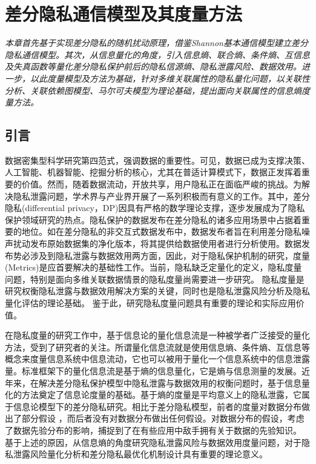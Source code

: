 
\chapter{差分隐私通信模型及其度量方法}\label{chapter03}
{\em 本章首先基于实现差分隐私的随机扰动原理，借鉴Shannon基本通信模型建立差分隐私通信模型。其次，从信息量化的角度，引入信息熵、联合熵、条件熵、互信息及失真函数等量化差分隐私保护前后的隐私信源熵、隐私泄露风险、数据效用。进一步，以此度量模型及方法为基础，针对多维关联属性的隐私量化问题，以关联性分析、关联依赖图模型、马尔可夫模型为理论基础，提出面向关联属性的信息熵度量方法。}

\section{引言}
数据密集型科学研究第四范式\cite{hey2009the}，强调数据的重要性。可见，数据已成为支撑决策、人工智能、机器智能、挖掘分析的核心，尤其在普适计算模式下，数据正发挥着重要的价值。然而，随着数据流动，开放共享，用户隐私正在面临严峻的挑战。为解决隐私泄露问题，学术界与产业界开展了一系列积极而有意义的工作。其中，差分隐私(differential privacy，DP)\cite{dwork2006differential,dwork2006calibrating}因具有严格的数学理论支撑，逐步发展成为了隐私保护领域研究的热点。隐私保护的数据发布在差分隐私的诸多应用场景中占据着重要的地位。如在差分隐私的非交互式数据发布中，数据发布者旨在利用差分隐私噪声扰动发布原始数据集的净化版本，将其提供给数据使用者进行分析使用。数据发布势必涉及到隐私泄露与数据效用两方面，因此，对于隐私保护机制的研究，度量(Metrics)是应首要解决的基础性工作。当前，隐私缺乏定量化的定义\cite{Lifenghua16}，隐私度量问题，特别是面向多维关联数据情景的隐私度量尚需要进一步研究\cite{ningbowu2019}。%
隐私度量是研究权衡隐私泄露与数据效用\cite{sankar2013utility,kalantari2018robust}解决方案的关键，同时也是隐私泄露风险分析及隐私量化评估的理论基础。 鉴于此，研究隐私度量问题具有重要的理论和实际应用价值。

在隐私度量\cite{alvim2012measuring,wagner2018technical,peng2016,xiongjinbo2018}的研究工作中，基于信息论的量化信息流\cite{smith2009on,boreale2015quantitative,alvim2011on,alvim2010differential}是一种被学者广泛接受的量化方法，受到了研究者的关注。所谓量化信息流就是使用信息熵、条件熵、互信息等概念来度量信息系统中信息流动，它也可以被用于量化一个信息系统中的信息泄露量。标准框架下的量化信息流是基于熵的信息量化，它是熵与信息测量\cite{renyi1961on}的发展。近年来，在解决差分隐私保护模型中隐私泄露与数据效用的权衡问题时，基于信息量化的方法奠定了信息论度量的基础\cite{mir2012information,alvim2011differential,wang2016on}。基于熵的度量是平均意义上的隐私泄露，它属于信息论模型下的差分隐私研究\cite{sarwate2014a}。相比于差分隐私模型\cite{dwork2006differential,dwork2006calibrating}，前者的度量对数据分布做出了部分假设 ，而后者没有对数据分布做出任何假设。对数据分布的假设，考虑了数据先验分布的影响，捕捉到了在有些应用中敌手拥有关于数据的先验知识\cite{kalantari2018robust}。 基于上述的原因，从信息熵的角度研究隐私泄露风险与数据效用度量问题，对于隐私泄露风险量化分析和差分隐私最优化机制设计具有重要的理论意义。


